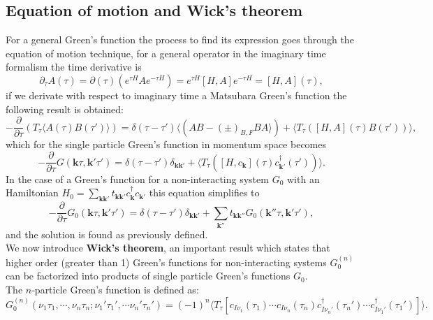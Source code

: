 \subsection{Equation of motion and Wick's theorem}
For a general Green's function the process to find its expression goes through the equation of motion technique, for a general 
operator in the imaginary time formalism the time derivative is
\begin{equation}
    \partial_\tau A(\tau)= \partial(\tau)\left(e^{\tau H}Ae^{-\tau H}\right)=e^{\tau H}[H,A]e^{-\tau H}=[H,A](\tau),
\end{equation}
if we derivate with respect to imaginary time a Matsubara Green's function the following result is obtained:
\begin{equation}
    -\frac{\partial}{\partial\tau}\left(T_\tau\langle A(\tau)B(\tau')\rangle\right)=\delta(\tau-\tau')\langle(AB-(\pm)_{B,F}BA\rangle)+\langle T_\tau\left([H,A](\tau)B(\tau')\right)\rangle,
\end{equation}
which for the single particle Green's function in momentum space becomes
\begin{equation}
    -\frac{\partial}{\partial \tau} G(\mathbf{k}\tau,\mathbf{k}'\tau')=\delta(\tau-\tau')\delta_{\mathbf{k}\mathbf{k}'}+\langle T_\tau\left([H,c_\mathbf{k}](\tau)c^\dagger_{\mathbf{k}'}(\tau')\right)\rangle.
\end{equation}
In the case of a Green's function for a non-interacting system $G_0$ with an Hamiltonian $H_0=\sum_{\mathbf{kk}'}t_{\mathbf{kk}'}c^\dagger_\mathbf{k}c_{\mathbf{k}'}$ this equation simplifies to
\begin{equation}
    -\frac{\partial}{\partial\tau}G_0(\mathbf{k}\tau,\mathbf{k}'\tau')=\delta(\tau-\tau')\delta_{\mathbf{k}\mathbf{k}'}+\sum_{\mathbf{k}''}t_{\mathbf{kk}''}G_0(\mathbf{k}''\tau,\mathbf{k}'\tau'),
\end{equation}
and the solution is found as previously defined.\\
We now introduce \textbf{Wick's theorem}, an important result which states that higher order (greater than 1) Green's functions for non-interacting 
systems $G_0^{(n)}$ can be factorized into products of single particle Green's functions $G_0$.\\
The $n$-particle Green's function is defined as:
\begin{equation}
    G_0^{(n)}(\nu_1\tau_1,\cdots,\nu_n\tau_n;\nu_1'\tau_1',\cdots\nu_n'\tau_n')=(-1)^n\langle T_\tau \left[c_{I\nu_1}(\tau_1)\cdots c_{I\nu_n}(\tau_n)c^\dagger_{I\nu_n'}(\tau_n')\cdots c^\dagger_{I\nu_1'}(\tau_1')\right]\rangle. 
    \label{G_0_n-order}
\end{equation}
